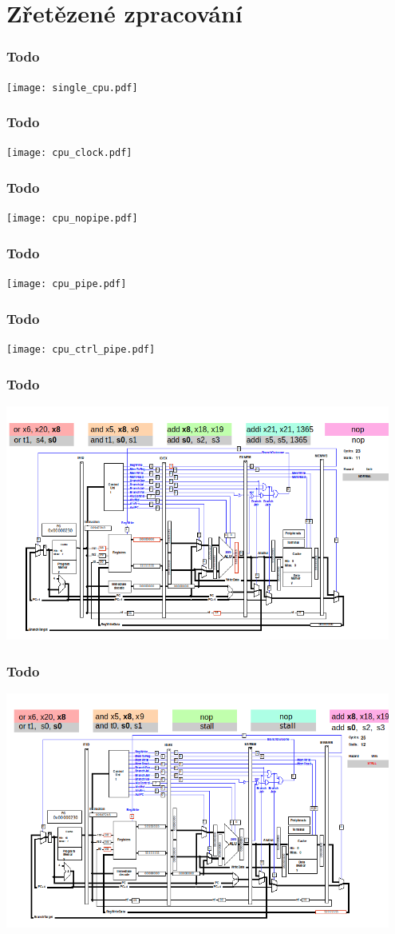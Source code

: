 \documentclass{beamer}
\subtitle{Lekce 05. Zřetězené zpracování\\Pipelining}
\author{Pavel Píša \phantom{xxxxxxx} Petr Štěpán \\ \small\texttt{pisa@fel.cvut.cz}\phantom{xxxx}\small\texttt{stepan@fel.cvut.cz}}
\begin{document}
\maketitle

\section{Zřetězené zpracování}

\begin{frame}
\frametitle{Todo}
\texttt{[image: single\_cpu.pdf]}
\end{frame}

\begin{frame}
\frametitle{Todo}
\texttt{[image: cpu\_clock.pdf]}
\end{frame}

\begin{frame}
\frametitle{Todo}
\texttt{[image: cpu\_nopipe.pdf]}
\end{frame}

\begin{frame}
\frametitle{Todo}
\texttt{[image: cpu\_pipe.pdf]}
\end{frame}

\begin{frame}
\frametitle{Todo}
\texttt{[image: cpu\_ctrl\_pipe.pdf]}
\end{frame}

\begin{frame}
\frametitle{Todo}
\includegraphics[width=0.95\textwidth]{fig/hazard-qtrvsim.png}
\end{frame}

\begin{frame}
\frametitle{Todo}
\includegraphics[width=0.95\textwidth]{fig/hazard-stall-qtrvsim.png}
\end{frame}
\end{document}
